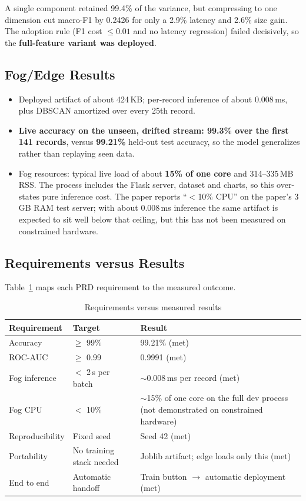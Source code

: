 \documentclass[12pt,a4paper]{article}
\begin{document}
A single component retained 99.4\% of the variance, but compressing to one dimension
cut macro-F1 by 0.2426 for only a 2.9\% latency and 2.6\% size gain. The adoption
rule (F1 cost $\le 0.01$ and no latency regression) failed decisively, so the
\textbf{full-feature variant was deployed}.

\subsection{Fog/Edge Results}
\begin{itemize}
  \item Deployed artifact of about 424\,KB; per-record inference of about 0.008\,ms,
        plus DBSCAN amortized over every 25th record.
  \item \textbf{Live accuracy on the unseen, drifted stream: 99.3\% over the first
        141 records}, versus \textbf{99.21\%} held-out test accuracy, so the model
        generalizes rather than replaying seen data.
  \item Fog resources: typical live load of about \textbf{15\% of one core} and
        314--335\,MB RSS. The process includes the Flask server, dataset and charts,
        so this over-states pure inference cost. The paper reports ``$<$10\% CPU'' on
        the paper's 3\,GB RAM test server; with about 0.008\,ms inference the same artifact is
        expected to sit well below that ceiling, but this has not been measured on
        constrained hardware.
\end{itemize}

\subsection{Requirements versus Results}
Table~\ref{tab:req-results} maps each PRD requirement to the measured outcome.

\begin{table}[H]
\caption{Requirements versus measured results}
\label{tab:req-results}
\centering
\small
\begin{tabular}{p{2.6cm}p{2.8cm}p{7.2cm}}
\toprule
\textbf{Requirement} & \textbf{Target} & \textbf{Result}\\
\midrule
Accuracy & $\ge$ 99\% & 99.21\% (met)\\
ROC-AUC & $\ge$ 0.99 & 0.9991 (met)\\
Fog inference & $<$ 2\,s per batch & $\sim$0.008\,ms per record (met)\\
Fog CPU & $<$ 10\% & $\sim$15\% of one core on the full dev process (not demonstrated on constrained hardware)\\
Reproducibility & Fixed seed & Seed 42 (met)\\
Portability & No training stack needed & Joblib artifact; edge loads only this (met)\\
End to end & Automatic handoff & Train button $\rightarrow$ automatic deployment (met)\\
\bottomrule
\end{tabular}
\end{table}
\end{document}
